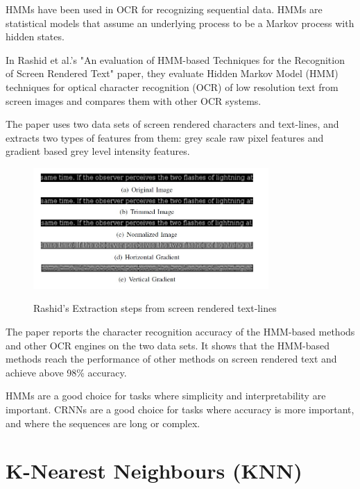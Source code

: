 HMMs have been used in OCR for recognizing sequential data. HMMs are statistical models that assume an underlying process to be a Markov process with hidden states.


In Rashid et al.'s "An evaluation of HMM-based Techniques for the Recognition of Screen Rendered Text" paper, they evaluate Hidden Markov Model (HMM) techniques for optical character recognition (OCR) of low resolution text from screen images and compares them with other OCR systems.

The paper uses two data sets of screen rendered characters and text-lines, and extracts two types of features from them: grey scale raw pixel features and gradient based grey level intensity features.


\begin{figure}[!h]
    \centering
    \includegraphics[width=0.8\textwidth]{Figures/HMM_Rashid.jpg}
    \caption[Rashid's Extraction steps from screen rendered text-lines]{Rashid's Extraction steps from screen rendered text-lines}\cite{rashidEvaluationHMMBasedTechniques2011}
    \label{fig:Rashid Feature Extraction Steps}
\end{figure}

The paper reports the character recognition accuracy of the HMM-based methods and other OCR engines on the two data sets. It shows that the HMM-based methods reach the performance of other methods on screen rendered text and achieve above 98\% accuracy.\cite{rashidEvaluationHMMBasedTechniques2011}

HMMs are a good choice for tasks where simplicity and interpretability are important. CRNNs are a good choice for tasks where accuracy is more important, and where the sequences are long or complex.

\newpage

\section{K-Nearest Neighbours (KNN)}

